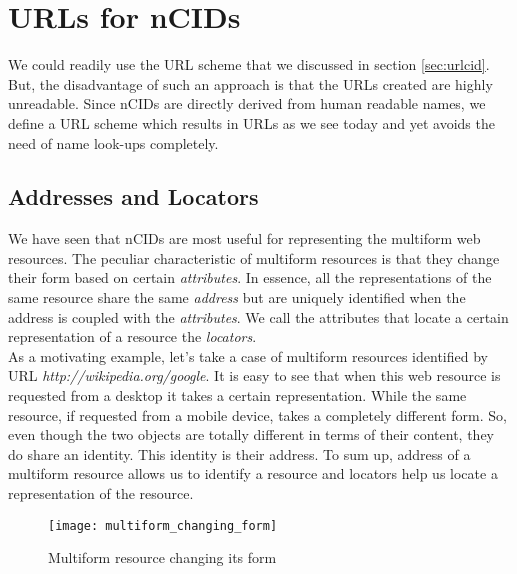 \section{URLs for nCIDs}
We could readily use the URL scheme that we discussed in section
\ref{sec:urlcid}. But, the disadvantage of such an approach is that
the URLs created are highly unreadable. Since nCIDs are directly
derived from human readable names, we define a URL scheme which
results in URLs as we see today and yet avoids the need of name
look-ups completely.

\subsection{Addresses and Locators}
\label{sec:addrnloc}
We have seen that nCIDs are most useful for representing the multiform
web resources. The peculiar characteristic of multiform resources is
that they change their form based on certain \emph{attributes}. In
essence, all the representations of the same resource share the same
\emph{address} but are uniquely identified when the address is coupled
with the \emph{attributes}. We call the attributes that locate a
certain representation of a resource the \emph{locators}.\\
As a motivating example, let's take a case of multiform resources
identified by URL \emph{http://wikipedia.org/google}. It is easy to
see that when this web resource is requested from a desktop it takes a
certain representation. While the same resource, if requested from a
mobile device, takes a completely different form. So, even though the
two objects are totally different in terms of their content, they do
share an identity. This identity is their address. To sum up,
address of a multiform resource allows us to identify a resource and
locators help us locate a representation of the resource.

\begin{figure}
\begin{center}
  \label{fig:multiform-change}
  \texttt{[image: multiform\_changing\_form]}
  \caption{Multiform resource changing its form}
\end{center}
\end{figure}

